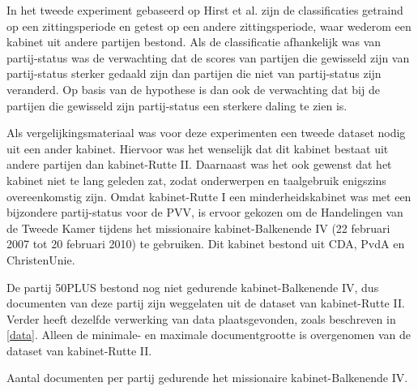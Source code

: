 In het tweede experiment gebaseerd op Hirst et al. zijn de classificaties getraind op een zittingsperiode en getest op een andere zittingsperiode, waar wederom een kabinet uit andere partijen bestond. Als de classificatie afhankelijk was van partij-status was de verwachting dat de scores van partijen die gewisseld zijn van partij-status sterker gedaald zijn dan partijen die niet van partij-status zijn veranderd. Op basis van de hypothese is dan ook de verwachting dat bij de partijen die gewisseld zijn partij-status een sterkere daling te zien is.\par
Als vergelijkingsmateriaal was voor deze experimenten een tweede dataset nodig uit een ander kabinet. Hiervoor was het wenselijk dat dit kabinet bestaat uit andere partijen dan kabinet-Rutte II. Daarnaast was het ook gewenst dat het kabinet niet te lang geleden zat, zodat onderwerpen en taalgebruik enigszins overeenkomstig zijn. Omdat kabinet-Rutte I een minderheidskabinet was met een bijzondere partij-status voor de PVV, is ervoor gekozen om de Handelingen van de Tweede Kamer tijdens het missionaire kabinet-Balkenende IV (22 februari 2007 tot 20 februari 2010) te gebruiken. Dit kabinet bestond uit CDA, PvdA en ChristenUnie.\par
De partij 50PLUS bestond nog niet gedurende kabinet-Balkenende IV, dus documenten van deze partij zijn weggelaten uit de dataset van kabinet-Rutte II. Verder heeft dezelfde verwerking van data plaatsgevonden, zoals beschreven in \ref{data}. Alleen de minimale- en maximale documentgrootte is overgenomen van de dataset van kabinet-Rutte II.\par

\begin{table}[H]
\label{aantallenBal}
\caption{Aantal documenten per partij gedurende het missionaire kabinet-Balkenende IV.}
\centering

\end{table}


